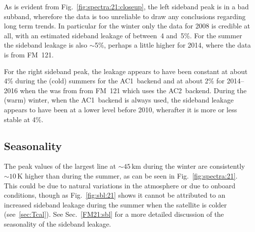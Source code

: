 As is evident from Fig.~\ref{fig:spectra:21:closeup}, the left sideband peak is
in a bad subband, wherefore the data is too unreliable to draw any conclusions
regarding long term trends. In particular for the winter only the data for 2008
is credible at all, with an estimated sideband leakage of between~4 and~5\%.
For the summer the sideband leakage is also $\sim$5\%, perhaps a little higher
for 2014, where the data is from FM~121.

For the right sideband peak, the leakage appears to have been constant at about
4\% during the (cold) summers for the AC1~backend and at about 2\% for
2014--2016 when the was from from FM~121 which uses the AC2~backend.
During the (warm) winter, when the AC1~backend is always used, the  sideband
leakage appears to have been at a lower level before 2010, wherafter it is more
or less stable at 4\%.


\subsection{Seasonality}
\label{FM21:seasonality}
The peak values of the largest  line at $\sim45\,\mathrm{km}$ during the
winter are consistently $\sim10\,\mathrm{K}$ higher than during the summer, as
can be seen in Fig.~\ref{fig:spectra:21}.  This could be due to natural
variations in the atmosphere or due to onboard conditions, though as
Fig.~\ref{fig:sbl:21} shows it cannot be attributed to an increased sideband
leakage during the summer when the satellite is colder (see~\ref{sec:Tcal}).
See Sec.~\ref{FM21:sbl} for a more detailed discussion of the seasonality of
the sideband leakage.
